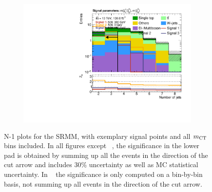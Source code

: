 \begin{figure}
\begin{subfigure}[b]{0.4\linewidth}
		\centering\includegraphics[width=\textwidth]{n1_SRMM_mct_bins/nJet30.pdf}
		\caption{\label{fig:Wh_reopt_second_round_n1_srmm_njet}}
	\end{subfigure}
	\caption{N-1 plots for the SRMM, with exemplary signal points and all $m_{\textrm{CT}}$ bins included. In all figures except \figname~, the significance in the lower pad is obtained by summing up all the events in the direction of the cut arrow and includes 30\% uncertainty as well as MC statistical uncertainty. In \figname~ the significance is only computed on a bin-by-bin basis, \ie not summing up all events in the direction of the cut arrow.}
	\label{fig:Wh_reopt_second_round_n1_srmm}
\end{figure}

